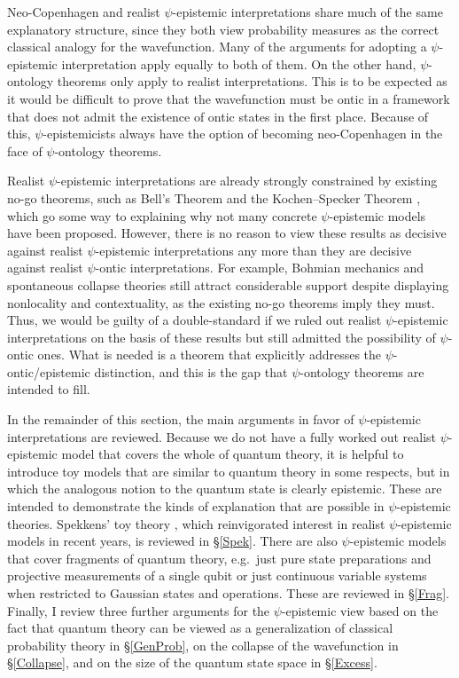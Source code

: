 \documentclass[DIV=calc,paper=a4,fontsize=11pt,twocolumn]{scrartcl} %
\theoremstyle{definition}
\theoremstyle{plain}
\begin{document}
Neo-Copenhagen and realist $\psi$-epistemic interpretations share much
of the same explanatory structure, since they both view probability
measures as the correct classical analogy for the wavefunction.  Many
of the arguments for adopting a $\psi$-epistemic interpretation apply
equally to both of them.  On the other hand, $\psi$-ontology theorems
only apply to realist interpretations.  This is to be expected as it
would be difficult to prove that the wavefunction must be ontic in a
framework that does not admit the existence of ontic states in the
first place.  Because of this, $\psi$-epistemicists always have the
option of becoming neo-Copenhagen in the face of $\psi$-ontology
theorems.

Realist $\psi$-epistemic interpretations are already strongly
constrained by existing no-go theorems, such as Bell's Theorem
\cite{Bell1964} and the Kochen--Specker Theorem \cite{Kochen1967},
which go some way to explaining why not many concrete $\psi$-epistemic
models have been proposed.  However, there is no reason to view these
results as decisive against realist $\psi$-epistemic interpretations
any more than they are decisive against realist $\psi$-ontic
interpretations.  For example, Bohmian mechanics and spontaneous
collapse theories still attract considerable support despite
displaying nonlocality and contextuality, as the existing no-go
theorems imply they must.  Thus, we would be guilty of a
double-standard if we ruled out realist $\psi$-epistemic
interpretations on the basis of these results but still admitted the
possibility of $\psi$-ontic ones.  What is needed is a theorem that
explicitly addresses the $\psi$-ontic/epistemic distinction, and this
is the gap that $\psi$-ontology theorems are intended to fill.

In the remainder of this section, the main arguments in favor of
$\psi$-epistemic interpretations are reviewed.  Because we do not have
a fully worked out realist $\psi$-epistemic model that covers the
whole of quantum theory, it is helpful to introduce toy models that
are similar to quantum theory in some respects, but in which the
analogous notion to the quantum state is clearly epistemic.  These are
intended to demonstrate the kinds of explanation that are possible in
$\psi$-epistemic theories.  Spekkens' toy theory \cite{Spekkens2007},
which reinvigorated interest in realist $\psi$-epistemic models in
recent years, is reviewed in \S\ref{Spek}.  There are also
$\psi$-epistemic models that cover fragments of quantum theory,
e.g.\ just pure state preparations and projective measurements of a
single qubit or just continuous variable systems when restricted to
Gaussian states and operations.  These are reviewed in \S\ref{Frag}.
Finally, I review three further arguments for the $\psi$-epistemic
view based on the fact that quantum theory can be viewed as a
generalization of classical probability theory in \S\ref{GenProb}, on
the collapse of the wavefunction in \S\ref{Collapse}, and on the size
of the quantum state space in \S\ref{Excess}.
\end{document}
